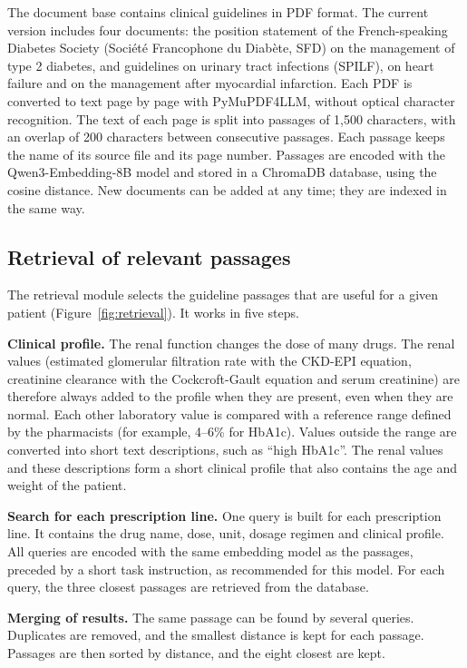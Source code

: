 \documentclass{article}
\begin{document}
The document base contains clinical guidelines in PDF format. The current version includes four documents: the position statement of the French-speaking Diabetes Society (Société Francophone du Diabète, SFD) on the management of type 2 diabetes, and guidelines on urinary tract infections (SPILF), on heart failure and on the management after myocardial infarction. %
Each PDF is converted to text page by page with PyMuPDF4LLM, without optical character recognition. The text of each page is split into passages of 1,500 characters, with an overlap of 200 characters between consecutive passages. Each passage keeps the name of its source file and its page number. Passages are encoded with the Qwen3-Embedding-8B model and stored in a ChromaDB database, using the cosine distance. New documents can be added at any time; they are indexed in the same way.

\subsection{Retrieval of relevant passages}

The retrieval module selects the guideline passages that are useful for a given patient (Figure~\ref{fig:retrieval}). It works in five steps.

\textbf{Clinical profile.} The renal function changes the dose of many drugs. The renal values (estimated glomerular filtration rate with the CKD-EPI equation, creatinine clearance with the Cockcroft-Gault equation and serum creatinine) are therefore always added to the profile when they are present, even when they are normal. Each other laboratory value is compared with a reference range defined by the pharmacists (for example, 4--6\% for HbA1c). Values outside the range are converted into short text descriptions, such as ``high HbA1c''. The renal values and these descriptions form a short clinical profile that also contains the age and weight of the patient.

\textbf{Search for each prescription line.} One query is built for each prescription line. It contains the drug name, dose, unit, dosage regimen and clinical profile. All queries are encoded with the same embedding model as the passages, preceded by a short task instruction, as recommended for this model. For each query, the three closest passages are retrieved from the database.

\textbf{Merging of results.} The same passage can be found by several queries. Duplicates are removed, and the smallest distance is kept for each passage. Passages are then sorted by distance, and the eight closest are kept.
\end{document}
